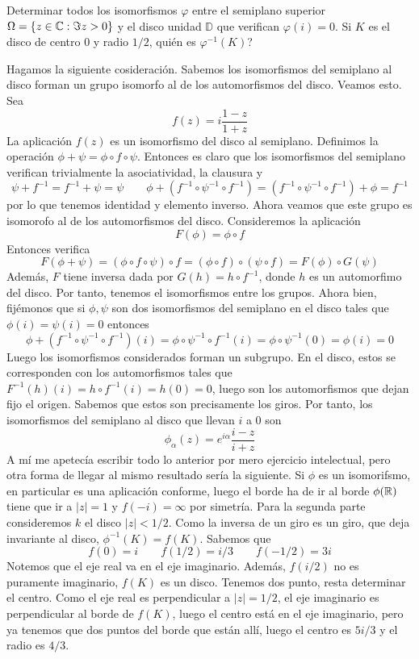 \documentclass[twoside]{article}
\begin{document}
\newpage
\begin{ejercicio}{7}
Determinar todos los isomorfismos $\varphi$ entre el semiplano superior $\Omega=\{ z\in \mathbb{C} : \Im z >0 \}$ y el disco unidad $\mathbb{D}$ que verifican $\varphi(i)=0$. Si $K$ es el disco de centro $0$ y radio $1/2$, quién es $\varphi^{-1}(K)$?
\end{ejercicio}
\begin{solucion}
Hagamos la siguiente cosideración. Sabemos los isomorfismos del semiplano al disco forman un grupo isomorfo al de los automorfismos del disco. Veamos esto. Sea
$$
f(z) = i\frac{1-z}{1+z}
$$
La aplicación $f(z)$ es un isomorfismo del disco al semiplano.
Definimos la operación $\phi+\psi = \phi \circ f \circ \psi$. Entonces es claro que los isomorfismos del semiplano verifican trivialmente la asociatividad, la clausura y
$$
\psi + f^{-1} = f^{-1} + \psi = \psi \qquad \phi + (f^{-1} \circ \psi^{-1} \circ f^{-1}) = (f^{-1} \circ \psi^{-1} \circ f^{-1}) + \phi = f^{-1}
$$
por lo que tenemos identidad y elemento inverso. Ahora veamos que este grupo es isomorofo al de los automorfismos del disco.  Consideremos la aplicación
$$
F(\phi) =  \phi \circ f
$$
Entonces verifica
$$
F(\phi + \psi) =(\phi \circ f \circ \psi) \circ f= (\phi\circ f)\circ (\psi\circ f) = F(\phi)\circ G(\psi)
$$
Además, $F$ tiene inversa dada por $G(h) = h \circ f^{-1}$, donde $h$ es un automorfimo del disco. Por tanto, tenemos el isomorfismos entre los grupos. Ahora bien, fijémonos que si $\phi,\psi$ son dos isomorfismos del semiplano en el disco tales que $\phi(i)=\psi(i)=0$ entonces
$$
\phi + (f^{-1}\circ \psi^{-1} \circ f^{-1})(i) = \phi \circ \psi^{-1} \circ f^{-1} (i) = \phi\circ \psi^{-1}(0) =\phi(i)=0
$$
Luego los isomorfismos considerados forman un subgrupo. En el disco, estos se corresponden con los automorfismos tales que $F^{-1}(h)(i) = h \circ f^{-1}(i)= h(0) = 0$, luego son los automorfismos que dejan fijo el origen. Sabemos que estos son precisamente los giros. Por tanto, los isomorfismos del semiplano al disco que llevan $i$ a $0$ son
$$
\phi_\alpha(z) = e^{i\alpha}\frac{i-z}{i+z}
$$
\newpage
A mí me apetecía escribir todo lo anterior por mero ejercicio intelectual, pero otra forma de llegar al mismo resultado sería la siguiente. Si $\phi$ es un isomorifsmo, en particular es una aplicación conforme, luego el borde ha de ir al borde $\phi(\mathbb{R})$ tiene que ir a $|z|=1$ y $f(-i) = \infty$ por simetría. 
\newline
Para la segunda parte consideremos $k$ el disco $|z|<1/2$. Como la inversa de un giro es un giro, que deja invariante al disco, $\phi^{-1}(K)=f(K)$. Sabemos que
$$
f(0) =i \qquad f(1/2)=i/3 \qquad f(-1/2) = 3i
$$
Notemos que el eje real va en el eje imaginario. Además, $f(i/2)$ no es puramente imaginario, $f(K)$ es un disco. Tenemos dos punto, resta determinar el centro. Como el eje real es perpendicular a $|z|=1/2$, el eje imaginario es perpendicular al borde de $f(K)$, luego el centro está en el eje imaginario, pero ya tenemos que dos puntos del borde que están allí, luego el centro es $5i/3$ y el radio es $4/3$.
\end{solucion}
\end{document}
